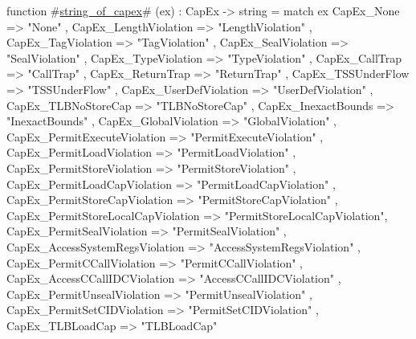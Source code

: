 function #\hyperref[sailMIPSzstringzyofzycapex]{string\_of\_capex}# (ex) : CapEx -> string =
  match ex {
    CapEx_None                          => "None"                        ,
    CapEx_LengthViolation               => "LengthViolation"             ,
    CapEx_TagViolation                  => "TagViolation"                ,
    CapEx_SealViolation                 => "SealViolation"               ,
    CapEx_TypeViolation                 => "TypeViolation"               ,
    CapEx_CallTrap                      => "CallTrap"                    ,
    CapEx_ReturnTrap                    => "ReturnTrap"                  ,
    CapEx_TSSUnderFlow                  => "TSSUnderFlow"                ,
    CapEx_UserDefViolation              => "UserDefViolation"            ,
    CapEx_TLBNoStoreCap                 => "TLBNoStoreCap"               ,
    CapEx_InexactBounds                 => "InexactBounds"               ,
    CapEx_GlobalViolation               => "GlobalViolation"             ,
    CapEx_PermitExecuteViolation        => "PermitExecuteViolation"      ,
    CapEx_PermitLoadViolation           => "PermitLoadViolation"         ,
    CapEx_PermitStoreViolation          => "PermitStoreViolation"        ,
    CapEx_PermitLoadCapViolation        => "PermitLoadCapViolation"      ,
    CapEx_PermitStoreCapViolation       => "PermitStoreCapViolation"     ,
    CapEx_PermitStoreLocalCapViolation  => "PermitStoreLocalCapViolation",
    CapEx_PermitSealViolation           => "PermitSealViolation"         ,
    CapEx_AccessSystemRegsViolation     => "AccessSystemRegsViolation"   ,
    CapEx_PermitCCallViolation          => "PermitCCallViolation"        ,
    CapEx_AccessCCallIDCViolation       => "AccessCCallIDCViolation"     ,
    CapEx_PermitUnsealViolation         => "PermitUnsealViolation"       ,
    CapEx_PermitSetCIDViolation         => "PermitSetCIDViolation"       ,
    CapEx_TLBLoadCap                    => "TLBLoadCap"
  }
